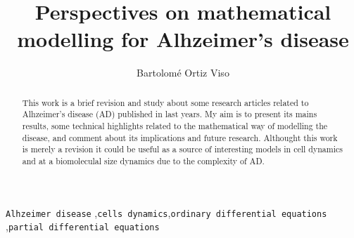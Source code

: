 \documentclass[1p]{elsarticle}
\begin{document}
\begin{frontmatter}

\title{Perspectives on mathematical modelling for Alhzeimer's disease}

\author{Bartolomé Ortiz Viso}
\address{Master en Física y Matemáticas\\ Universidad de Granada\\17/01/2018}

\begin{abstract}
This work is a brief revision and study about some research articles related to Alhzeimer's disease (AD) published in last years. My aim is to present its mains results, some technical highlights related to the mathematical way of modelling the disease, and comment about its implications and future research. Althought this work is merely a revision it could be useful as a source of interesting models in cell dynamics and at a biomoleculal size dynamics due to the complexity of AD.
\end{abstract}

\begin{keyword}
 \texttt{Alhzeimer disease} \sep \texttt{cells dynamics}\sep \texttt{ordinary differential equations} \sep \texttt{partial differential equations}

\end{keyword}

\end{frontmatter}

\linenumbers
\end{document}
